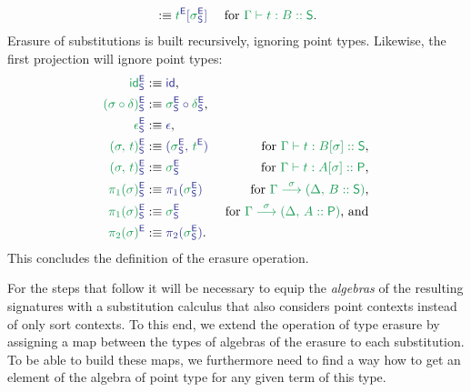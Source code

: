 \begin{defn}
\begin{align*}
  &:\equiv \tqm{\grm{t}^\EE[\grm{\sigma}^\EE_\Sc]}
  & \text{ for \grm{\Gamma \vdash t : B :: \Sc}.}
\end{align*}
Erasure of substitutions is built recursively, ignoring point types.
Likewise, the first projection will ignore point types:
\begin{align*}\label{eq:red-e-sub}
\tqm{\grm{\id}^\EE_\Sc}
  &:\equiv \tqm{\id} \text{,}
  & \\
\tqm{\grm{(\sigma \circ \delta)}^\EE_\Sc}
  &:\equiv \tqm{\grm{\sigma}^\EE_\Sc \circ \grm{\delta}^\EE_\Sc} \text{,}
  & \\
\tqm{\grm{\epsilon}^\EE_\Sc}
  &:\equiv \tqm{\epsilon} \text{,}
  & \\
\tqm{\grm{(\sigma,\, t)}^\EE_\Sc}
  &:\equiv \tqm{(\grm{\sigma}^\EE_\Sc,\, \grm{t}^\EE)}
  & \text{ for \grm{\Gamma \vdash t : B[\sigma] :: \Sc},} \\
\tqm{\grm{(\sigma,\, t)}^\EE_\Sc}
  &:\equiv \tqm{\grm{\sigma}^\EE_\Sc}
  & \text{ for \grm{\Gamma \vdash t : A[\sigma] :: \Pc},} \\
\tqm{\grm{\pi_1(\sigma)}^\EE_\Sc}
  &:\equiv \tqm{\pi_1(\grm{\sigma}^\EE_\Sc)}
  & \text{ for \grm{\IISub{\sigma}{\Gamma}{(\Delta,\, B :: \Sc)}},} \\
\tqm{\grm{\pi_1(\sigma)}^\EE_\Sc}
  &:\equiv \tqm{\grm{\sigma}^\EE_\Sc}
  & \text{ for \grm{\IISub{\sigma}{\Gamma}{(\Delta,\, A :: \Pc)}}, and} \\
\tqm{\grm{\pi_2(\sigma)}^\EE}
  &:\equiv \tqm{\pi_2(\grm{\sigma}^\EE_\Sc)} \text{.}
  &
\end{align*} %
This concludes the definition of the erasure operation.
\end{defn} %

For the steps that follow it will be necessary to equip the \emph{algebras}
of the resulting signatures with a substitution calculus that also considers
point contexts instead of only sort contexts.
To this end, we extend the operation of type erasure by assigning a map between
the types of algebras of the erasure to each substitution.
To be able to build these maps, we furthermore need to find a way how to get an
element of the algebra of point type for any given term of this type.

